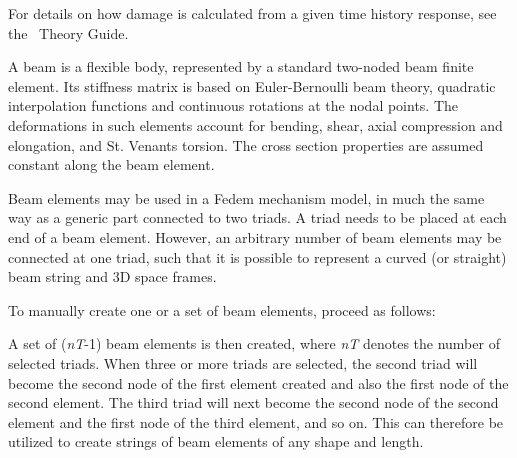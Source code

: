 For details on how damage is calculated from a given time history response,
see the \FedemVer~Theory Guide.

\clearpage



A beam is a flexible body, represented by a standard two-noded beam
finite element. Its stiffness matrix is based on Euler-Bernoulli beam
theory, quadratic interpolation functions and continuous rotations at
the nodal points. The deformations in such elements account for bending,
shear, axial compression and elongation, and St. Venants torsion. The
cross section properties are assumed constant along the beam element.

Beam elements may be used in a Fedem mechanism model, in much the same
way as a generic part connected to two triads. A triad needs to be
placed at each end of a beam element. However, an arbitrary number of
beam elements may be connected at one triad, such that it is possible to
represent a curved (or straight) beam string and 3D space frames.



To manually create one or a set of beam elements, proceed as follows:

\vskip20mm

A set of ({\sl nT}-1) beam elements is then created, where {\sl nT}
denotes the number of selected triads. When three or more triads are
selected, the second triad will become the second node of the first
element created and also the first node of the second element. The third
triad will next become the second node of the second element and the
first node of the third element, and so on. This can therefore be
utilized to create strings of beam elements of any shape and length.

